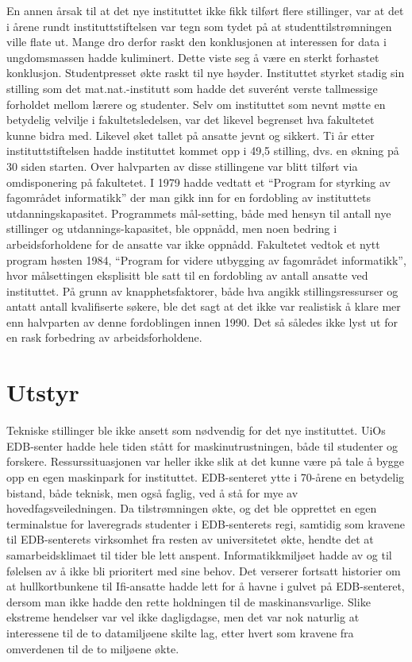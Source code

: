 En annen årsak til at det nye instituttet ikke fikk tilført flere stillinger, var at det i årene rundt instituttstiftelsen var tegn som tydet på at studenttilstrømningen ville flate ut. Mange dro derfor raskt den konklusjonen at interessen for data i ungdomsmassen hadde kuliminert. Dette viste seg å være en sterkt forhastet konklusjon. Studentpresset økte raskt til nye høyder. Instituttet styrket stadig sin stilling som det mat.nat.-institutt som hadde det suverént verste tallmessige forholdet mellom lærere og studenter. Selv om instituttet som nevnt møtte en betydelig velvilje i fakultetsledelsen, var det likevel begrenset hva fakultetet kunne bidra med. Likevel øket tallet på ansatte jevnt og sikkert. Ti år etter instituttstiftelsen hadde instituttet kommet opp i 49,5 stilling, dvs. en økning på 30 siden starten. Over halvparten av disse stillingene var blitt tilført via omdisponering på fakultetet. I 1979 hadde vedtatt et ``Program for styrking av fagområdet informatikk'' der man gikk inn for en fordobling av instituttets utdanningskapasitet. Programmets mål-setting, både med hensyn til antall nye stillinger og utdannings-kapasitet, ble oppnådd, men noen bedring i arbeidsforholdene for de ansatte var ikke oppnådd. Fakultetet vedtok et nytt program høsten 1984, ``Program for videre utbygging av fagområdet informatikk'', hvor målsettingen eksplisitt ble satt til en fordobling av antall ansatte ved instituttet. På grunn av knapphetsfaktorer, både hva angikk stillingsressurser og antatt antall kvalifiserte søkere, ble det sagt at det ikke var realistisk å klare mer enn halvparten av denne fordoblingen innen 1990. Det så således ikke lyst ut for en rask forbedring av arbeidsforholdene.

\section{Utstyr}

Tekniske stillinger ble ikke ansett som nødvendig for det nye instituttet. UiOs EDB-senter hadde hele tiden stått for maskinutrustningen, både til studenter og forskere. Ressurssituasjonen var heller ikke slik at det kunne være på tale å bygge opp en egen maskinpark for instituttet. EDB-senteret ytte i 70-årene en betydelig bistand, både teknisk, men også faglig, ved å stå for mye av hovedfagsveiledningen. Da tilstrømningen økte, og det ble opprettet en egen terminalstue for laveregrads studenter i EDB-senterets regi, samtidig som kravene til EDB-senterets virksomhet fra resten av universitetet økte, hendte det at samarbeidsklimaet til tider ble lett anspent. Informatikkmiljøet hadde av og til følelsen av å ikke bli prioritert med sine behov. Det verserer fortsatt historier om at hullkortbunkene til Ifi-ansatte hadde lett for å havne i gulvet på EDB-senteret, dersom man ikke hadde den rette holdningen til de maskinansvarlige. Slike ekstreme hendelser var vel ikke dagligdagse, men det var nok naturlig at interessene til de to datamiljøene skilte lag, etter hvert som kravene fra omverdenen til de to miljøene økte.

